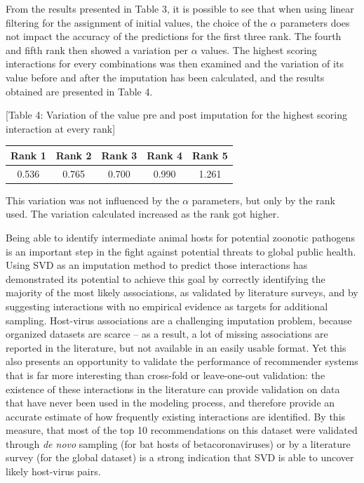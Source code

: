 \documentclass[10pt,oneside]{article}
\begin{document}
From the results presented in Table 3, it is possible to see that when
using linear filtering for the assignment of initial values, the choice
of the \(\alpha\) parameters does not impact the accuracy of the
predictions for the first three rank. The fourth and fifth rank then
showed a variation per \(\alpha\) values. The highest scoring
interactions for every combinations was then examined and the variation
of its value before and after the imputation has been calculated, and
the results obtained are presented in Table 4.

{[}Table 4: Variation of the value pre and post imputation for the
highest scoring interaction at every rank{]}

\begin{longtable}[]{@{}ccccc@{}}
\toprule
Rank 1 & Rank 2 & Rank 3 & Rank 4 & Rank 5\tabularnewline
\midrule
\endhead
0.536 & 0.765 & 0.700 & 0.990 & 1.261\tabularnewline
\bottomrule
\end{longtable}

This variation was not influenced by the \(\alpha\) parameters, but only
by the rank used. The variation calculated increased as the rank got
higher.

Being able to identify intermediate animal hosts for potential zoonotic
pathogens is an important step in the fight against potential threats to
global public health. Using SVD as an imputation method to predict those
interactions has demonstrated its potential to achieve this goal by
correctly identifying the majority of the most likely associations, as
validated by literature surveys, and by suggesting interactions with no
empirical evidence as targets for additional sampling. Host-virus
associations are a challenging imputation problem, because organized
datasets are scarce -- as a result, a lot of missing associations are
reported in the literature, but not available in an easily usable
format. Yet this also presents an opportunity to validate the
performance of recommender systems that is far more interesting than
cross-fold or leave-one-out validation: the existence of these
interactions in the literature can provide validation on data that have
never been used in the modeling process, and therefore provide an
accurate estimate of how frequently existing interactions are
identified. By this measure, that most of the top 10 recommendations on
this dataset were validated through \emph{de novo} sampling (for bat
hosts of betacoronaviruses) or by a literature survey (for the global
dataset) is a strong indication that SVD is able to uncover likely
host-virus pairs.
\end{document}
